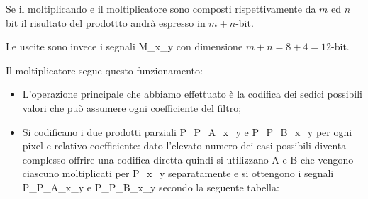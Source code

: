 Se il moltiplicando e il moltiplicatore sono composti rispettivamente da $m$ ed $n$ bit il risultato del prodottto andrà espresso in $m+n$-bit.

Le uscite sono invece i segnali M\_x\_y con dimensione $m+n=8+4=12$-bit.

\bigskip
Il moltiplicatore segue questo funzionamento:
\begin{itemize}
	\item L'operazione principale che abbiamo effettuato è la codifica dei sedici possibili valori che può assumere ogni coefficiente del filtro;
	\item Si codificano i due prodotti parziali P\_P\_A\_x\_y e P\_P\_B\_x\_y per ogni pixel e relativo coefficiente: 
	dato l'elevato numero dei casi possibili diventa complesso offrire una codifica diretta quindi si utilizzano A e B che vengono ciascuno moltiplicati per P\_x\_y separatamente e si ottengono i segnali P\_P\_A\_x\_y e P\_P\_B\_x\_y secondo la seguente tabella:
	\begin{table}[H]
		\centering
\end{table}
\end{itemize}
